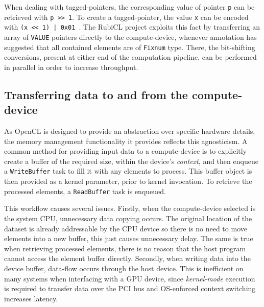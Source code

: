 When dealing with tagged-pointers, the corresponding value of pointer \verb|p| can be retrieved with \verb|p >> 1|. To create a tagged-pointer, the value \verb|x| can be encoded with \verb?(x << 1) | 0x01 ?. The RubiCL project exploits this fact by transferring an array of \verb|VALUE| pointers directly to the compute-device, whenever annotation has suggested that all contained elements are of \verb|Fixnum| type. There, the bit-shifting conversions, present at either end of the computation pipeline, can be performed in parallel in order to increase throughput.

\subsection{Transferring data to and from the compute-device}
As \ac{OpenCL} is designed to provide an abstraction over specific hardware details, the memory management functionality it provides reflects this agnosticism.
A common method for providing input data to a compute-device is to explicitly create a buffer of the required size, within the device's \emph{context}, and then enqueue a \verb|WriteBuffer| task to fill it with any elements to process. This buffer object is then provided as a kernel parameter, prior to kernel invocation. To retrieve the processed elements, a \verb|ReadBuffer| task is enqueued.

This workflow causes several issues. Firstly, when the compute-device selected is the system \ac{CPU}, unnecessary data copying occurs. The original location of the dataset is already addressable by the \ac{CPU} device so there is no need to move elements into a new buffer, this just causes unnecessary delay. The same is true when retrieving processed elements, there is no reason that the host program cannot access the element buffer directly. Secondly, when writing data into the device buffer, data-flow occurs through the host device. This is inefficient on many systems when interfacing with a \ac{GPU} device, since \emph{kernel-mode} execution is required to transfer data over the \ac{PCI} bus and \ac{OS}-enforced context switching increases latency.

